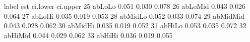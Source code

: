 \begin{Schunk}
\begin{Soutput}
      label   est ci.lower ci.upper
25   abLoLo 0.051    0.030    0.078
26  abLoMid 0.043    0.026    0.064
27   abLoHi 0.035    0.019    0.053
28  abMidLo 0.052    0.033    0.074
29 abMidMid 0.043    0.028    0.062
30  abMidHi 0.035    0.019    0.052
31   abHiLo 0.053    0.035    0.072
32  abHiMid 0.044    0.029    0.062
33   abHiHi 0.036    0.019    0.055
\end{Soutput}
\end{Schunk}
